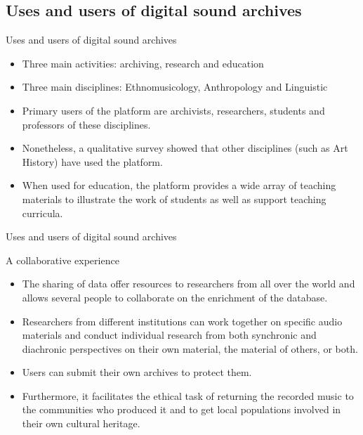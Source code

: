 \documentclass[final, hyperref, table]{beamer}
\begin{document}
\subsection{Uses and users of digital sound archives}
\begin{frame}{Uses and users of digital sound archives}
   \begin{block}{}\normalsize
\begin{itemize}
      \item Three main activities: \alert{archiving,
      research and education}
  \item Three main disciplines: \alert{Ethnomusicology, Anthropology and Linguistic}
    \item Primary users of the platform are archivists, researchers, students
      and professors of these disciplines.
    \item Nonetheless, a qualitative survey showed that other
      disciplines (such as Art History) have used the platform.
       \item When used for education, the platform provides a wide array
      of teaching materials to illustrate the work of students as well
      as support teaching curricula.
    \end{itemize}
  \end{block}

\end{frame}
\begin{frame}{Uses and users of digital sound archives}
  \begin{block}{A collaborative experience}
    \begin{itemize}
    \item The sharing of data offer resources to researchers from all over the world and allows several people to \alert{collaborate on the enrichment of the database}.
     \item Researchers from different institutions can work together on
      specific audio materials and conduct individual research from
      both synchronic and diachronic perspectives on their own
      material, the material of others, or both.
    \item Users can submit their own archives to protect them.

    \item Furthermore, it facilitates the ethical task of \alert{returning
      the recorded music to the communities who produced it} and to get local populations involved in their own cultural heritage.

   
    \end{itemize}
  \end{block}

\end{frame}
\end{document}
